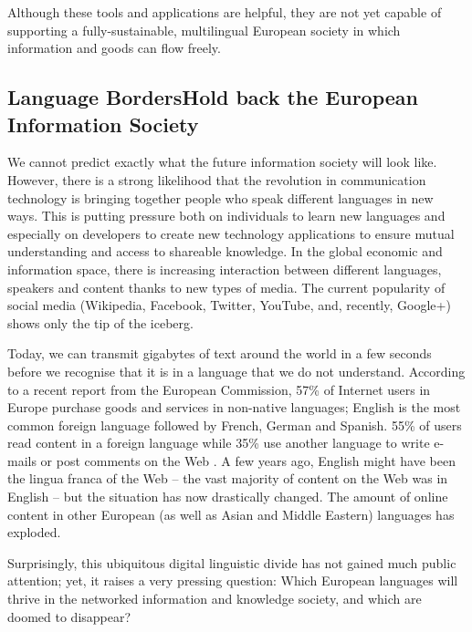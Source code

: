 \begin{multicols}{2}
Although these tools and applications are helpful, they are not yet capable of supporting a fully-sustainable, multilingual European society in which information and goods can flow freely.

\subsection[Language Borders Hold back the European Information Society]{Language Borders\newline Hold back the European Information Society}

We cannot predict exactly what the future information society will look like. However, there is a strong likelihood that the revolution in communication technology is bringing together people who speak different languages in new ways. This is putting pressure both on individuals to learn new languages and especially on developers to create new technology applications to ensure mutual understanding and access to shareable knowledge. In the global economic and information space, there is increasing interaction between different languages, speakers and content thanks to new types of media. The current popularity of social media (Wikipedia, Facebook, Twitter, YouTube, and, recently, Google+) shows only the tip of the iceberg.


Today, we can transmit gigabytes of text around the world in a few
seconds before we recognise that it is in a language that we do not
understand. According to a recent report from the European Commission,
57\% of Internet users in Europe purchase goods and services in
non-native languages; English is the most common foreign language
followed by French, German and Spanish. 55\% of users read content in
a foreign language while 35\% use another language to write e-mails or
post comments on the Web \cite{EC1}. A few years ago, English might
have been the lingua franca of the Web -- the vast majority of content
on the Web was in English -- but the situation has now drastically changed. The amount of online content in other European (as well as Asian and Middle Eastern) languages has exploded.

Surprisingly, this ubiquitous digital linguistic divide has not gained much public attention; yet, it raises a very pressing question: Which European languages will thrive in the networked information and knowledge society, and which are doomed to disappear?


\end{multicols}
